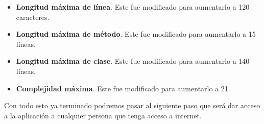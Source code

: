 \begin{itemize}
  \item \textbf{Longitud máxima de línea}. Este fue modificado para aumentarlo a 120 caracteres.
  \item \textbf{Longitud máxima de método}. Este fue modificado para aumentarlo a 15 líneas.
  \item \textbf{Longitud máxima de clase}. Este fue modificado para aumentarlo a 140 líneas.
  \item \textbf{Complejidad máxima}. Este fue modificado para aumentarlo a 21.
\end{itemize}

Con todo esto ya terminado podremos pasar al siguiente paso que será
dar acceso a la aplicación a cualquier persona que tenga acceso a internet.
